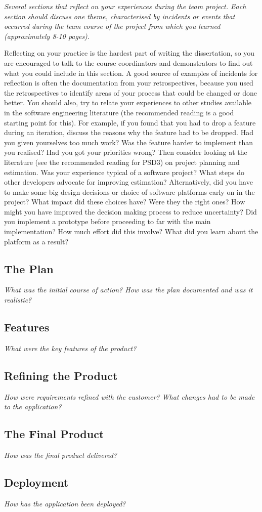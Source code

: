 \documentclass[../dissertation.tex]{subfiles}
\begin{document}
\textit{Several sections that reflect on your experiences during the team project. Each section should discuss one theme, characterised by incidents or events that occurred during the team course of the project from which you learned (approximately 8-10 pages).}

Reflecting on your practice is the hardest part of writing the dissertation, so you are encouraged to talk to the course coordinators and demonstrators to find out what you could include in this section. A good source of examples of incidents for reflection is often the documentation from your retrospectives, because you used the retrospectives to identify areas of your process that could be changed or done better. You should also, try to relate your experiences to other studies available in the software engineering literature (the recommended reading is a good starting point for this). For example, if you found that you had to drop a feature during an iteration, discuss the reasons why the feature had to be dropped. Had you given yourselves too much work? Was the feature harder to implement than you realised? Had you got your priorities wrong? Then consider looking at the literature (see the recommended reading for PSD3) on project planning and estimation. Was your experience typical of a software project? What steps do other developers advocate for improving estimation? Alternatively, did you have to make some big design decisions or choice of software platforms early on in the project? What impact did these choices have? Were they the right ones? How might you have improved the decision making process to reduce uncertainty? Did you implement a prototype before proceeding to far with the main implementation? How much effort did this involve? What did you learn about the platform as a result?

\subsection{The Plan}

\textit{What was the initial course of action? How was the plan documented and was it realistic?}

\subsection{Features}

\textit{What were the key features of the product?}

\subsection{Refining the Product}

\textit{How were requirements refined with the customer? What changes had to be made to the application?}

\subsection{The Final Product}

\textit{How was the final product delivered?}

\subsection{Deployment}

\textit{How has the application been deployed?}
\end{document}
